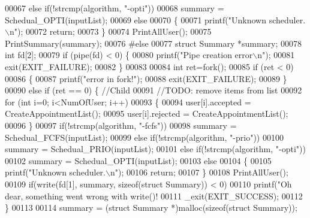 \begin{DoxyCode}
00067     \textcolor{keywordflow}{else} \textcolor{keywordflow}{if}(!strcmp(algorithm, \textcolor{stringliteral}{"-opti"}))
00068         summary = Schedual_OPTI(inputList);
00069     \textcolor{keywordflow}{else}
00070     \{
00071         printf(\textcolor{stringliteral}{"Unknown scheduler.\(\backslash\)n"});
00072         \textcolor{keywordflow}{return};
00073     \}
00074     PrintAllUser();
00075     PrintSummary(summary);
00076 \textcolor{preprocessor}{#else}
00077     \textcolor{keyword}{struct }Summary *summary;
00078     \textcolor{keywordtype}{int} fd[2];
00079     \textcolor{keywordflow}{if} (pipe(fd) < 0) \{
00080         printf(\textcolor{stringliteral}{"Pipe creation error\(\backslash\)n"});
00081         exit(EXIT\_FAILURE);
00082     \}
00083 
00084     \textcolor{keywordtype}{int} ret=fork();
00085     \textcolor{keywordflow}{if} (ret < 0)
00086     \{
00087         printf(\textcolor{stringliteral}{"error in fork!"});
00088         exit(EXIT\_FAILURE);
00089     \}
00090     \textcolor{keywordflow}{else} \textcolor{keywordflow}{if} (ret == 0) \{    \textcolor{comment}{//Child}
00091         \textcolor{comment}{//TODO: remove items from list}
00092         \textcolor{keywordflow}{for} (\textcolor{keywordtype}{int} i=0; i<NumOfUser; i++)
00093         \{
00094             user[i].accepted = CreateAppointmentList();
00095             user[i].rejected = CreateAppointmentList();
00096         \}
00097         \textcolor{keywordflow}{if}(!strcmp(algorithm, \textcolor{stringliteral}{"-fcfs"}))
00098             summary = Schedual_FCFS(inputList);
00099         \textcolor{keywordflow}{else} \textcolor{keywordflow}{if}(!strcmp(algorithm, \textcolor{stringliteral}{"-prio"}))
00100             summary = Schedual_PRIO(inputList);
00101         \textcolor{keywordflow}{else} \textcolor{keywordflow}{if}(!strcmp(algorithm, \textcolor{stringliteral}{"-opti"}))
00102             summary = Schedual_OPTI(inputList);
00103         \textcolor{keywordflow}{else}
00104         \{
00105             printf(\textcolor{stringliteral}{"Unknown scheduler.\(\backslash\)n"});
00106             \textcolor{keywordflow}{return};
00107         \}
00108         PrintAllUser();
00109         \textcolor{keywordflow}{if}(write(fd[1], summary, \textcolor{keyword}{sizeof}(\textcolor{keyword}{struct} Summary)) < 0)
00110             printf(\textcolor{stringliteral}{"Oh dear, something went wrong with write()! %
00111         \_exit(EXIT\_SUCCESS);
00112     \}
00113 
00114     summary = (\textcolor{keyword}{struct }Summary *)malloc(\textcolor{keyword}{sizeof}(\textcolor{keyword}{struct} Summary));
}
\end{DoxyCode}
